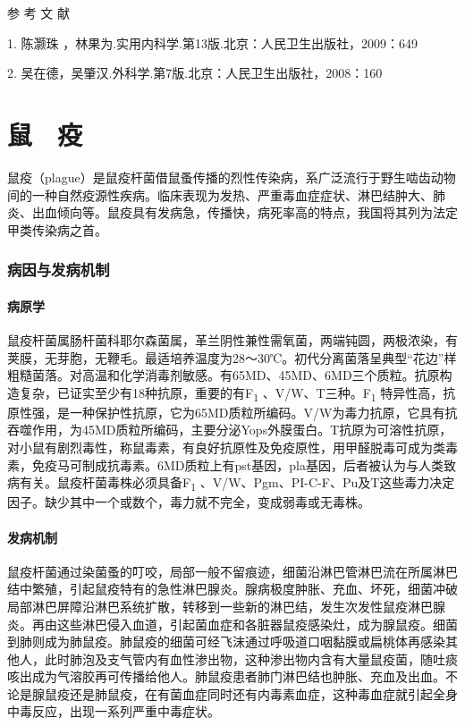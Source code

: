 \protect\hypertarget{text00234.html}{}{}

\hypertarget{text00234.htmlux5cux23CHP7-12-5}{}
参 考 文 献

1. 陈灏珠 ，林果为.实用内科学.第13版.北京：人民卫生出版社，2009：649

2. 吴在德，吴肇汉.外科学.第7版.北京：人民卫生出版社，2008：160

\protect\hypertarget{text00235.html}{}{}

\chapter{鼠　疫}

鼠疫（plague）是鼠疫杆菌借鼠蚤传播的烈性传染病，系广泛流行于野生啮齿动物间的一种自然疫源性疾病。临床表现为发热、严重毒血症症状、淋巴结肿大、肺炎、出血倾向等。鼠疫具有发病急，传播快，病死率高的特点，我国将其列为法定甲类传染病之首。

\subsection{病因与发病机制}

\subsubsection{病原学}

鼠疫杆菌属肠杆菌科耶尔森菌属，革兰阴性兼性需氧菌，两端钝圆，两极浓染，有荚膜，无芽胞，无鞭毛。最适培养温度为28～30℃。初代分离菌落呈典型“花边”样粗糙菌落。对高温和化学消毒剂敏感。有65MD、45MD、6MD三个质粒。抗原构造复杂，已证实至少有18种抗原，重要的有F\textsubscript{1}
、V/W、T三种。F\textsubscript{1}
特异性高，抗原性强，是一种保护性抗原，它为65MD质粒所编码。V/W为毒力抗原，它具有抗吞噬作用，为45MD质粒所编码，主要分泌Yops外膜蛋白。T抗原为可溶性抗原，对小鼠有剧烈毒性，称鼠毒素，有良好抗原性及免疫原性，用甲醛脱毒可成为类毒素，免疫马可制成抗毒素。6MD质粒上有pst基因，pla基因，后者被认为与人类致病有关。鼠疫杆菌毒株必须具备F\textsubscript{1}
、V/W、Pgm、PI-C-F、Pu及T这些毒力决定因子。缺少其中一个或数个，毒力就不完全，变成弱毒或无毒株。

\subsubsection{发病机制}

鼠疫杆菌通过染菌蚤的叮咬，局部一般不留痕迹，细菌沿淋巴管淋巴流在所属淋巴结中繁殖，引起鼠疫特有的急性淋巴腺炎。腺病极度肿胀、充血、坏死，细菌冲破局部淋巴屏障沿淋巴系统扩散，转移到一些新的淋巴结，发生次发性鼠疫淋巴腺炎。再由这些淋巴侵入血道，引起菌血症和各脏器鼠疫感染灶，成为腺鼠疫。细菌到肺则成为肺鼠疫。肺鼠疫的细菌可经飞沫通过呼吸道口咽黏膜或扁桃体再感染其他人，此时肺泡及支气管内有血性渗出物，这种渗出物内含有大量鼠疫菌，随吐痰咳出成为气溶胶再可传播给他人。肺鼠疫患者肺门淋巴结也肿胀、充血及出血。不论是腺鼠疫还是肺鼠疫，在有菌血症同时还有内毒素血症，这种毒血症就引起全身中毒反应，出现一系列严重中毒症状。

